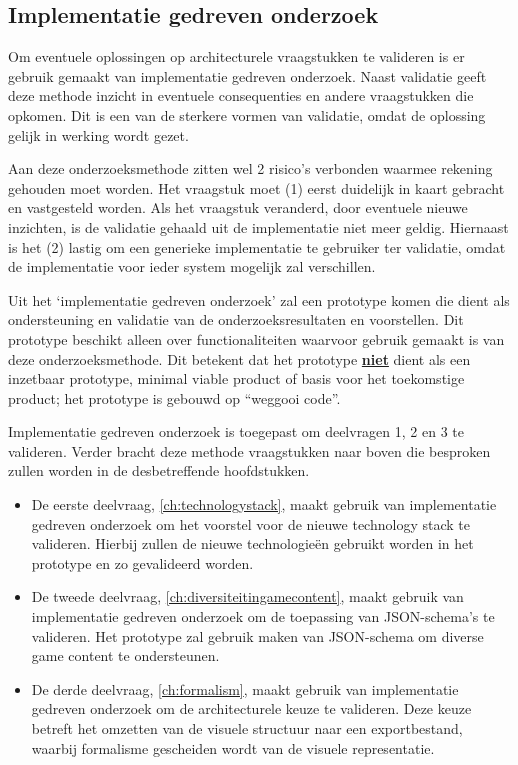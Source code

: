 \subsection{Implementatie gedreven onderzoek}
Om eventuele oplossingen op architecturele vraagstukken te valideren is er gebruik gemaakt van implementatie gedreven onderzoek. Naast validatie geeft deze methode inzicht in eventuele consequenties en andere vraagstukken die opkomen. Dit is een van de sterkere vormen van validatie, omdat de oplossing gelijk in werking wordt gezet.

Aan deze onderzoeksmethode zitten wel 2 risico’s verbonden waarmee rekening gehouden moet worden\cite{ResearchSkillsInComputerScience}. Het vraagstuk moet (1) eerst duidelijk in kaart gebracht en vastgesteld worden. Als het vraagstuk veranderd, door eventuele nieuwe inzichten, is de validatie gehaald uit de implementatie niet meer geldig. Hiernaast is het (2) lastig om een generieke implementatie te gebruiker ter validatie, omdat de implementatie voor ieder system mogelijk zal verschillen.

Uit het ‘implementatie gedreven onderzoek’ zal een prototype komen die dient als ondersteuning en validatie van de onderzoeksresultaten en voorstellen. Dit prototype beschikt alleen over functionaliteiten waarvoor gebruik gemaakt is van deze onderzoeksmethode. Dit betekent dat het prototype \underline{\textbf{niet}} dient als een inzetbaar prototype, minimal viable product of basis voor het toekomstige product; het prototype is gebouwd op “weggooi code”.

Implementatie gedreven onderzoek is toegepast om deelvragen 1, 2 en 3 te valideren. Verder bracht deze methode vraagstukken naar boven die besproken zullen worden in de desbetreffende hoofdstukken.

\begin{itemize}
    \item De eerste deelvraag, \autoref{ch:technologystack}, maakt gebruik van implementatie gedreven onderzoek om het voorstel voor de nieuwe technology stack te valideren. Hierbij zullen de nieuwe technologieën gebruikt worden in het prototype en zo gevalideerd worden.
    \item De tweede deelvraag, \autoref{ch:diversiteitingamecontent}, maakt gebruik van implementatie gedreven onderzoek om de toepassing van JSON-schema’s te valideren. Het prototype zal gebruik maken van JSON-schema om diverse game content te ondersteunen.
    \item De derde deelvraag, \autoref{ch:formalism}, maakt gebruik van implementatie gedreven onderzoek om de architecturele keuze te valideren. Deze keuze betreft het omzetten van de visuele structuur naar een exportbestand, waarbij formalisme gescheiden wordt van de visuele representatie.
\end{itemize}
    
